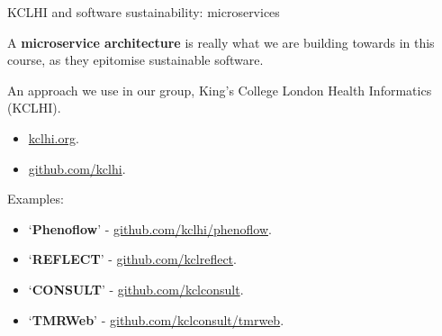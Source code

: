 \documentclass[10pt, dvipsnames, table, aspectratio=169]{beamer}
\begin{document}
\begin{frame}[fragile]{KCLHI and software sustainability: microservices}

A \textbf{microservice architecture} is really what we are building towards in this course, as they epitomise sustainable software.

An approach we use in our group, King's College London Health Informatics (KCLHI).

\begin{itemize}

    \item \href{https://kclhi.org}{kclhi.org}.
    
    \item \href{https://github.com/kclhi}{github.com/kclhi}.
    
\end{itemize}

Examples:

\begin{itemize}
    
    \item `\textbf{Phenoflow}' - \href{https://github.com/kclhi/phenoflow}{github.com/kclhi/phenoflow}. 
    \item `\textbf{REFLECT}' - \href{https://github.com/kclreflect}{github.com/kclreflect}.   
    \item `\textbf{CONSULT}' - \href{https://github.com/kclconsult}{github.com/kclconsult}.
    \item `\textbf{TMRWeb}' - \href{https://github.com/kclconsult/tmrweb}{github.com/kclconsult/tmrweb}.

\end{itemize}

\end{frame}
\end{document}
